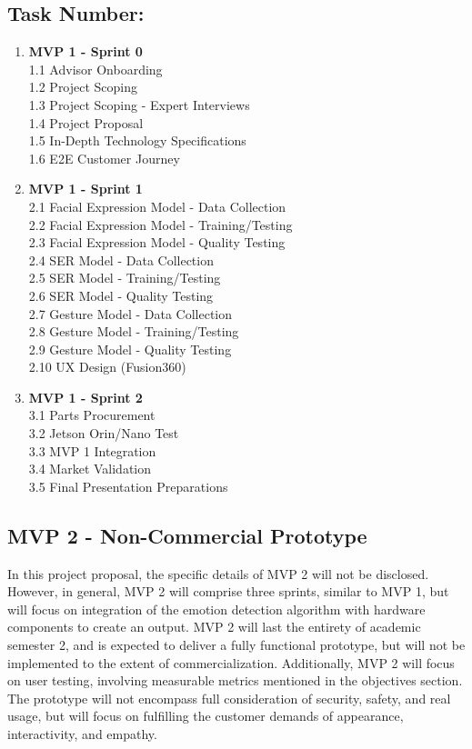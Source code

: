 \subsection*{Task Number:}
\begin{enumerate}
\item\textbf{MVP 1 - Sprint 0}\\
1.1	Advisor Onboarding\\
1.2	Project Scoping\\
1.3	Project Scoping - Expert Interviews\\
1.4	Project Proposal\\
1.5	In-Depth Technology Specifications\\
1.6	E2E Customer Journey\\
\item\textbf{MVP 1 - Sprint 1}\\
2.1	Facial Expression Model - Data Collection\\
2.2	Facial Expression Model - Training/Testing\\
2.3	Facial Expression Model - Quality Testing\\
2.4	SER Model - Data Collection\\
2.5	SER Model - Training/Testing\\
2.6	SER Model - Quality Testing\\
2.7	Gesture Model - Data Collection\\
2.8	Gesture Model - Training/Testing\\
2.9	Gesture Model - Quality Testing\\
2.10 UX Design (Fusion360)\\
\item\textbf{MVP 1 - Sprint 2}\\
3.1	Parts Procurement\\
3.2	Jetson Orin/Nano Test\\
3.3	MVP 1 Integration \\
3.4	Market Validation\\
3.5	Final Presentation Preparations\\
\end{enumerate}

\newpage
\subsection{MVP 2 - Non-Commercial Prototype}

In this project proposal, the specific details of MVP 2 will not be disclosed. However, in general, MVP 2 will comprise three sprints, similar to MVP 1, but will focus on integration of the emotion detection algorithm with hardware components to create an output. MVP 2 will last the entirety of academic semester 2, and is expected to deliver a fully functional prototype, but will not be implemented to the extent of commercialization. Additionally, MVP 2 will focus on user testing, involving measurable metrics mentioned in the objectives section. The prototype will not encompass full consideration of security, safety, and real usage, but will focus on fulfilling the customer demands of appearance, interactivity, and empathy.

